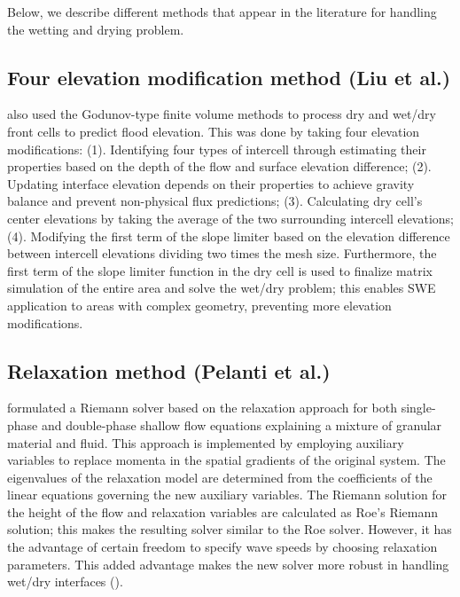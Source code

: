 \documentclass[10pt,a4paper]{article}
\begin{document}
Below, we describe different methods that appear in the literature for handling the wetting and drying problem.

	\subsection{Four elevation modification  method (Liu et al.)}
		\citet{li-ta-wa-ca-ba-ch-li:2021} also used the Godunov-type finite volume methods to process dry and wet/dry front cells to predict flood elevation. This was done by taking four elevation modifications: (1).  Identifying four types of intercell through estimating their properties based on the depth of the flow and surface elevation difference; (2). Updating interface elevation depends on their properties to achieve gravity balance and prevent non-physical flux predictions;  (3).  Calculating dry cell's center elevations by taking the average of the two surrounding intercell elevations; (4). Modifying the first term of the slope limiter based on the elevation difference between intercell elevations dividing two times the mesh size. Furthermore, the first term of the slope limiter function in the dry cell is used to finalize matrix simulation of the entire area and solve the wet/dry problem; this enables SWE application to areas with complex geometry, preventing more elevation modifications.
	
	\subsection{Relaxation method (Pelanti et al.)}

 \citet{pelanti2011riemann} formulated a Riemann solver based on the relaxation approach for both single-phase and double-phase shallow flow equations explaining a mixture of granular material and fluid. This approach is implemented by employing auxiliary variables to replace momenta in the spatial gradients of the original system. The eigenvalues of the relaxation model are determined from the coefficients of the linear equations governing the new auxiliary variables.  The Riemann solution for the height of the flow and relaxation variables are calculated as Roe's Riemann solution; this makes the resulting solver similar to the Roe solver. However, it has the advantage of certain freedom to specify wave speeds by choosing relaxation parameters. This added advantage makes the new solver more robust in handling wet/dry interfaces (\cite{pelanti2008relaxation,pelanti2011riemann}).
\end{document}

